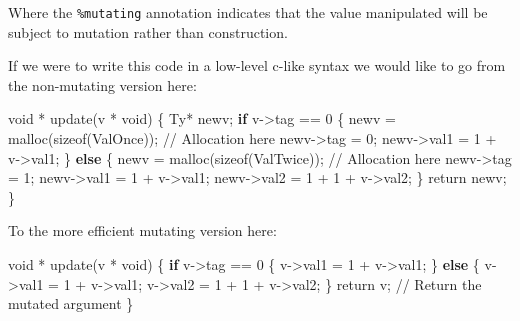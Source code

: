 \documentclass[
]{article}
\newenvironment{Shaded}{}{}
\newcommand{\DataTypeTok}[1]{\textcolor[rgb]{0.56,0.13,0.00}{#1}}
\newcommand{\DecValTok}[1]{\textcolor[rgb]{0.25,0.63,0.44}{#1}}
\newcommand{\FunctionTok}[1]{\textcolor[rgb]{0.02,0.16,0.49}{#1}}
\newcommand{\KeywordTok}[1]{\textcolor[rgb]{0.00,0.44,0.13}{\textbf{#1}}}
\newcommand{\NormalTok}[1]{#1}
\newcommand{\OperatorTok}[1]{\textcolor[rgb]{0.40,0.40,0.40}{#1}}
\newcommand{\OtherTok}[1]{\textcolor[rgb]{0.00,0.44,0.13}{#1}}
\begin{document}
Where the \texttt{\%mutating} annotation indicates that the value
manipulated will be subject to mutation rather than construction.

If we were to write this code in a low-level c-like syntax we would like
to go from the non-mutating version here:

\begin{Shaded}
\begin{Highlighting}[]
\NormalTok{void }\OperatorTok{*}\NormalTok{ update(v }\OperatorTok{*}\NormalTok{ void) \{}
    \DataTypeTok{Ty}\OperatorTok{*}\NormalTok{ newv;}
    \KeywordTok{if}\NormalTok{ v}\OtherTok{{-}\textgreater{}}\NormalTok{tag }\OperatorTok{==} \DecValTok{0}\NormalTok{ \{}
\NormalTok{        newv }\OtherTok{=}\NormalTok{ malloc(sizeof(}\DataTypeTok{ValOnce}\NormalTok{)); }\OperatorTok{//} \DataTypeTok{Allocation}\NormalTok{ here}
\NormalTok{        newv}\OtherTok{{-}\textgreater{}}\NormalTok{tag }\OtherTok{=} \DecValTok{0}\NormalTok{;}
\NormalTok{        newv}\OtherTok{{-}\textgreater{}}\NormalTok{val1 }\OtherTok{=} \DecValTok{1} \OperatorTok{+}\NormalTok{ v}\OtherTok{{-}\textgreater{}}\NormalTok{val1;}
\NormalTok{    \} }\KeywordTok{else}\NormalTok{ \{}
\NormalTok{        newv }\OtherTok{=}\NormalTok{ malloc(sizeof(}\DataTypeTok{ValTwice}\NormalTok{)); }\OperatorTok{//} \DataTypeTok{Allocation}\NormalTok{ here}
\NormalTok{        newv}\OtherTok{{-}\textgreater{}}\NormalTok{tag }\OtherTok{=} \DecValTok{1}\NormalTok{;}
\NormalTok{        newv}\OtherTok{{-}\textgreater{}}\NormalTok{val1 }\OtherTok{=} \DecValTok{1} \OperatorTok{+}\NormalTok{ v}\OtherTok{{-}\textgreater{}}\NormalTok{val1;}
\NormalTok{        newv}\OtherTok{{-}\textgreater{}}\NormalTok{val2 }\OtherTok{=} \DecValTok{1} \OperatorTok{+} \DecValTok{1} \OperatorTok{+}\NormalTok{ v}\OtherTok{{-}\textgreater{}}\NormalTok{val2;}
\NormalTok{    \}}
    \FunctionTok{return}\NormalTok{ newv;}
\NormalTok{\}}
\end{Highlighting}
\end{Shaded}

To the more efficient mutating version here:

\begin{Shaded}
\begin{Highlighting}[]
\NormalTok{void }\OperatorTok{*}\NormalTok{ update(v }\OperatorTok{*}\NormalTok{ void) \{}
    \KeywordTok{if}\NormalTok{ v}\OtherTok{{-}\textgreater{}}\NormalTok{tag }\OperatorTok{==} \DecValTok{0}\NormalTok{ \{}
\NormalTok{        v}\OtherTok{{-}\textgreater{}}\NormalTok{val1 }\OtherTok{=} \DecValTok{1} \OperatorTok{+}\NormalTok{ v}\OtherTok{{-}\textgreater{}}\NormalTok{val1;}
\NormalTok{    \} }\KeywordTok{else}\NormalTok{ \{}
\NormalTok{        v}\OtherTok{{-}\textgreater{}}\NormalTok{val1 }\OtherTok{=} \DecValTok{1} \OperatorTok{+}\NormalTok{ v}\OtherTok{{-}\textgreater{}}\NormalTok{val1;}
\NormalTok{        v}\OtherTok{{-}\textgreater{}}\NormalTok{val2 }\OtherTok{=} \DecValTok{1} \OperatorTok{+} \DecValTok{1} \OperatorTok{+}\NormalTok{ v}\OtherTok{{-}\textgreater{}}\NormalTok{val2;}
\NormalTok{    \}}
    \FunctionTok{return}\NormalTok{ v; }\OperatorTok{//} \DataTypeTok{Return}\NormalTok{ the mutated argument}
\NormalTok{\}}
\end{Highlighting}
\end{Shaded}
\end{document}
